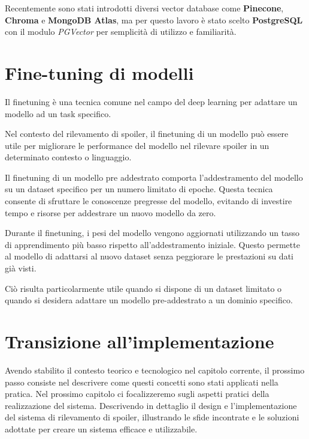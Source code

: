 Recentemente sono stati introdotti diversi vector database
come \textbf{Pinecone}, \textbf{Chroma} e \textbf{MongoDB
  Atlas}, ma per questo lavoro è stato scelto
\textbf{PostgreSQL} con il modulo \textit{PGVector} per
semplicità di utilizzo e familiarità.

\section{Fine-tuning di modelli}
\label{sec:finetuning-di-modelli}

Il finetuning è una tecnica comune nel campo del deep
learning per adattare un modello ad un task specifico.

Nel contesto del rilevamento di spoiler, il finetuning di
un modello può essere utile per migliorare le performance
del modello nel rilevare spoiler in un determinato contesto
o linguaggio.

Il finetuning di un modello pre addestrato comporta
l'addestramento del modello su un dataset specifico per un
numero limitato di epoche.
Questa tecnica consente di sfruttare le conoscenze
pregresse del modello, evitando di investire tempo e
risorse per addestrare un nuovo modello da zero.

Durante il finetuning, i pesi del modello vengono
aggiornati utilizzando un tasso di apprendimento più basso
rispetto all'addestramento iniziale.
Questo permette al modello di adattarsi al nuovo dataset
senza peggiorare le prestazioni su dati già visti.

Ciò risulta particolarmente utile quando si dispone di un
dataset limitato o quando si desidera adattare un modello
pre-addestrato a un dominio specifico.

\newpage
\section{Transizione all'implementazione}
\label{sec:transizione-implementazione}
Avendo stabilito il contesto teorico e tecnologico nel
capitolo corrente, il prossimo passo consiste nel
descrivere come questi concetti sono stati applicati nella
pratica.
Nel prossimo capitolo ci focalizzeremo sugli aspetti
pratici della realizzazione del sistema.
Descrivendo in dettaglio il design e l'implementazione del
sistema di rilevamento di spoiler, illustrando le sfide
incontrate e le soluzioni adottate per creare
un sistema efficace e utilizzabile.

